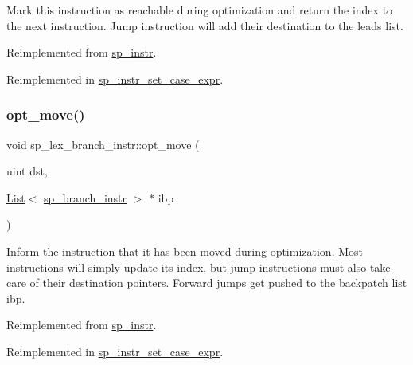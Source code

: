 Mark this instruction as reachable during optimization and return the index to the next instruction. Jump instruction will add their destination to the leads list. 

Reimplemented from \mbox{\hyperlink{classsp__instr_a10b7b33a30316fca4cff5adfe98e282c}{sp\+\_\+instr}}.



Reimplemented in \mbox{\hyperlink{classsp__instr__set__case__expr_a40890fccd0dca44d11d61dcb0a88b043}{sp\+\_\+instr\+\_\+set\+\_\+case\+\_\+expr}}.

\mbox{\label{classsp__lex__branch__instr_ae7d74a74399102d85e481c4e46751cfe}} 
\subsubsection{\texorpdfstring{opt\+\_\+move()}{opt\_move()}}
{\footnotesize\ttfamily void sp\+\_\+lex\+\_\+branch\+\_\+instr\+::opt\+\_\+move (\begin{DoxyParamCaption}\item[{uint}]{dst,  }\item[{\mbox{\hyperlink{classList}{List}}$<$ \mbox{\hyperlink{classsp__branch__instr}{sp\+\_\+branch\+\_\+instr}} $>$ $\ast$}]{ibp }\end{DoxyParamCaption})\hspace{0.3cm}{\ttfamily [virtual]}}

Inform the instruction that it has been moved during optimization. Most instructions will simply update its index, but jump instructions must also take care of their destination pointers. Forward jumps get pushed to the backpatch list \textquotesingle{}ibp\textquotesingle{}. 

Reimplemented from \mbox{\hyperlink{classsp__instr_a7b73990576fc8cd3f4a8bd16003ab44b}{sp\+\_\+instr}}.



Reimplemented in \mbox{\hyperlink{classsp__instr__set__case__expr_abc03926238c4442d32e3bfb4d89fcac1}{sp\+\_\+instr\+\_\+set\+\_\+case\+\_\+expr}}.

\mbox{\label{classsp__lex__branch__instr_ae3ef8f864474467824615e33f0663d76}} 
